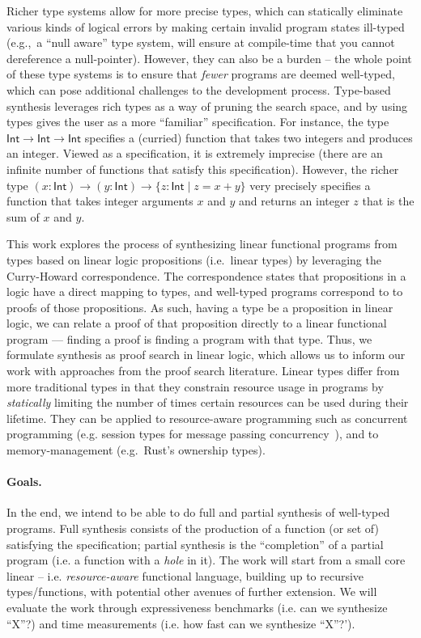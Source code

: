 \documentclass{llncs}
\newcommand{\mypara}[1]{\paragraph{\textbf{#1}.}}
\begin{document}
Richer type systems allow for more precise types, which can
statically eliminate various kinds of logical errors by making certain
invalid program states ill-typed (e.g.,~a ``null aware'' type system,
will ensure at compile-time that you cannot dereference a
null-pointer). However, they can also be a burden -- the whole point
of these type systems is to ensure that \emph{fewer} programs are
deemed well-typed, which can pose additional challenges to the
development process. Type-based synthesis leverages rich types as a
way of pruning the search space, and by using types gives the user as
a more ``familiar'' specification. For instance, the type
$\mathsf{Int} \rightarrow \mathsf{Int} \rightarrow \mathsf{Int}$
specifies a (curried) function that takes two integers and produces an
integer. Viewed as a specification, it is extremely imprecise (there
are an infinite number of functions that satisfy this specification).
However, the richer type $(x{:}\mathsf{Int}) \rightarrow
(y{:}\mathsf{Int}) \rightarrow \{z{:}\mathsf{Int} \mid z = x+y\}$
very precisely specifies a function that takes integer arguments $x$
and $y$ and returns an integer $z$ that is the sum of $x$ and $y$. 


%
This work explores the process of synthesizing linear functional
programs from types based on linear logic propositions (i.e.~linear
types) by leveraging the Curry-Howard correspondence.  The
correspondence states that propositions in a logic have a direct
mapping to types, and well-typed programs correspond to to proofs of
those propositions.  As such, having a type be a proposition in linear
logic, we can relate a proof of that proposition directly to a linear
functional program — finding a proof is finding a program with that
type. Thus, we formulate synthesis as proof search in linear logic,
which allows us to inform our work with approaches from the proof
search literature.  Linear types differ from more traditional types in
that they constrain resource usage in programs by \emph{statically}
limiting the number of times certain resources can be used during
their lifetime.  They can be applied to resource-aware programming
such as concurrent programming (e.g. session types for message passing
concurrency~\cite{}), and to memory-management (e.g.~Rust's ownership
types).

\mypara{Goals}
In the end, we intend to be able to do full and partial synthesis of
well-typed programs. Full synthesis consists of the production of a
function (or set of) satisfying the specification; partial synthesis
is the ``completion'' of a partial program (i.e. a function with a
\emph{hole} in it). The work will start from a small core linear --
i.e. \emph{resource-aware} functional language, building up to
recursive types/functions, with potential other avenues of further
extension. 
%
We will evaluate the work through
expressiveness benchmarks (i.e. can we synthesize ``X''?) and time
measurements (i.e. how fast can we synthesize ``X''?').
\end{document}
